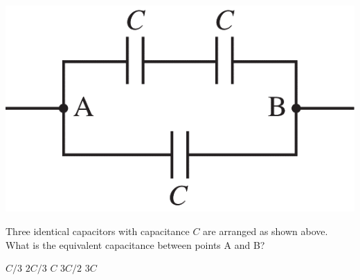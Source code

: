 
\begin{center}
    \includegraphics[scale=0.3]{images/img-014-029.png}
\end{center}

\begin{questions}\setcounter{question}{27}\question
Three identical capacitors with capacitance $C$ are arranged as shown above. What is the equivalent capacitance between points A and B?

\begin{oneparchoices}
    \choice $C / 3$
    \choice $2C / 3$
    \choice $C$
    \choice $3C / 2$
    \choice $3C$
\end{oneparchoices}
\end{questions}
